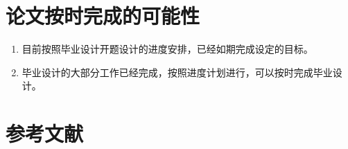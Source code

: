 \section{论文按时完成的可能性}
\begin{enumerate}
    \setlength{\itemsep}{0pt}
    \setlength{\parsep}{0pt}
    \setlength{\parskip}{0pt}
    \setlength{\topsep}{0pt}
    \setlength{\partopsep}{0pt}
    \item 目前按照毕业设计开题设计的进度安排，已经如期完成设定的目标。
    \item 毕业设计的大部分工作已经完成，按照进度计划进行，可以按时完成毕业设计。
\end{enumerate}
\section{参考文献}
